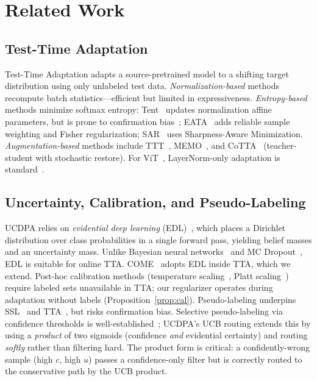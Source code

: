 \section{Related Work}
\label{sec:related}

\subsection{Test-Time Adaptation}
\label{sec:related:tta}

Test-Time Adaptation adapts a source-pretrained model to a shifting target distribution using only unlabeled test data. \emph{Normalization-based} methods~\citep{schneider2020adabn,nado2020adabn} recompute batch statistics---efficient but limited in expressiveness. \emph{Entropy-based} methods minimize softmax entropy: Tent~\citep{wang2021tent} updates normalization affine parameters, but is prone to confirmation bias~\citep{niu2022eata,mummadi2021test}; EATA~\citep{niu2022eata} adds reliable sample weighting and Fisher regularization; SAR~\citep{niu2023sar} uses Sharpness-Aware Minimization. \emph{Augmentation-based} methods include TTT~\citep{sun2020ttt}, MEMO~\citep{zhang2022memo}, and CoTTA~\citep{wang2022cotta} (teacher-student with stochastic restore). For ViT~\citep{dosovitskiy2021vit}, LayerNorm-only adaptation is standard~\citep{niu2023sar,come2024come}.

\subsection{Uncertainty, Calibration, and Pseudo-Labeling}
\label{sec:related:uncertainty}

UCDPA relies on \emph{evidential deep learning} (EDL)~\citep{sensoy2018evidential,amini2020evidential}, which places a Dirichlet distribution over class probabilities in a single forward pass, yielding belief masses and an uncertainty mass. Unlike Bayesian neural networks~\citep{kendall2017uncertainties,abdar2021review} and MC Dropout~\citep{gal2016dropout}, EDL is suitable for online TTA. COME~\citep{come2024come} adopts EDL inside TTA, which we extend. Post-hoc calibration methods (temperature scaling~\citep{guo2017calibration}, Platt scaling~\citep{platt1999probabilistic}) require labeled sets unavailable in TTA; our regularizer operates during adaptation without labels (Proposition~\ref{prop:cal}). Pseudo-labeling underpins SSL~\citep{sohn2020fixmatch,xie2020selftraining,lee2013pseudo} and TTA~\citep{prabhu2023lada,chen2023minimize}, but risks confirmation bias. Selective pseudo-labeling via confidence thresholds is well-established~\citep{niu2022eata}; UCDPA's UCB routing extends this by using a \emph{product} of two sigmoids (confidence \emph{and} evidential certainty) and routing \emph{softly} rather than filtering hard. The product form is critical: a confidently-wrong sample (high $c$, high $u$) passes a confidence-only filter but is correctly routed to the conservative path by the UCB product.

